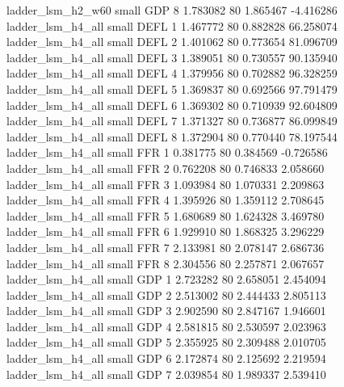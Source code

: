        ladder_lsm_h2_w60      small      GDP                 8 1.783082 80       1.865467          -4.416286
       ladder_lsm_h4_all      small     DEFL                 1 1.467772 80       0.882828          66.258074
       ladder_lsm_h4_all      small     DEFL                 2 1.401062 80       0.773654          81.096709
       ladder_lsm_h4_all      small     DEFL                 3 1.389051 80       0.730557          90.135940
       ladder_lsm_h4_all      small     DEFL                 4 1.379956 80       0.702882          96.328259
       ladder_lsm_h4_all      small     DEFL                 5 1.369837 80       0.692566          97.791479
       ladder_lsm_h4_all      small     DEFL                 6 1.369302 80       0.710939          92.604809
       ladder_lsm_h4_all      small     DEFL                 7 1.371327 80       0.736877          86.099849
       ladder_lsm_h4_all      small     DEFL                 8 1.372904 80       0.770440          78.197544
       ladder_lsm_h4_all      small      FFR                 1 0.381775 80       0.384569          -0.726586
       ladder_lsm_h4_all      small      FFR                 2 0.762208 80       0.746833           2.058660
       ladder_lsm_h4_all      small      FFR                 3 1.093984 80       1.070331           2.209863
       ladder_lsm_h4_all      small      FFR                 4 1.395926 80       1.359112           2.708645
       ladder_lsm_h4_all      small      FFR                 5 1.680689 80       1.624328           3.469780
       ladder_lsm_h4_all      small      FFR                 6 1.929910 80       1.868325           3.296229
       ladder_lsm_h4_all      small      FFR                 7 2.133981 80       2.078147           2.686736
       ladder_lsm_h4_all      small      FFR                 8 2.304556 80       2.257871           2.067657
       ladder_lsm_h4_all      small      GDP                 1 2.723282 80       2.658051           2.454094
       ladder_lsm_h4_all      small      GDP                 2 2.513002 80       2.444433           2.805113
       ladder_lsm_h4_all      small      GDP                 3 2.902590 80       2.847167           1.946601
       ladder_lsm_h4_all      small      GDP                 4 2.581815 80       2.530597           2.023963
       ladder_lsm_h4_all      small      GDP                 5 2.355925 80       2.309488           2.010705
       ladder_lsm_h4_all      small      GDP                 6 2.172874 80       2.125692           2.219594
       ladder_lsm_h4_all      small      GDP                 7 2.039854 80       1.989337           2.539410
